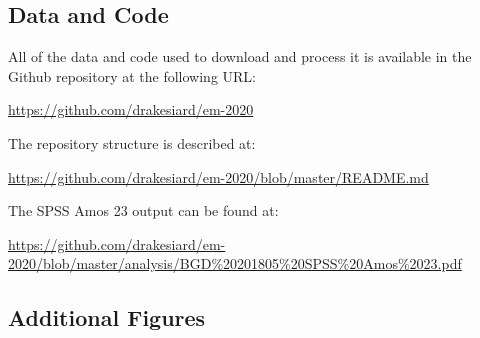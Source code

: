 \documentclass[11pt,a4paper]{article}
\begin{document}
\subsection{Data and Code}\label{sec:data_and_code}

All of the data and code used to download and process it is available in the Github repository at the following URL:

\url{https://github.com/drakesiard/em-2020}

\noindent
The repository structure is described at:

\url{https://github.com/drakesiard/em-2020/blob/master/README.md}

\noindent
The SPSS Amos 23 output can be found at:

\begin{adjustbox}{max width=\textwidth}
\url{https://github.com/drakesiard/em-2020/blob/master/analysis/BGD\%20201805\%20SPSS\%20Amos\%2023.pdf}
\end{adjustbox}

\subsection{Additional Figures}\label{sec:graph_appendix}

\listoffigures
\listoftables
\end{document}
